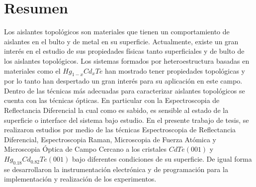 \chapter{Resumen}
\label{chap:abstract}

Los aislantes topológicos son materiales que tienen un comportamiento de aislantes en el bulto y de metal en su 
superficie. Actualmente, existe un gran interés en el estudio de sus propiedades físicas tanto superficiales y
de bulto de los aislantes topológicos. Los sistemas formados por heteroestructura basadas en materiales como el 
$ Hg_{1-x}Cd_{x}Te $ han mostrado tener propiedades topológicas y por lo tanto han despertado un gran interés para 
su aplicación en este campo. Dentro de las técnicas más adecuadas para caracterizar aislantes topológicos se cuenta 
con las técnicas ópticas. En particular con la Espectroscopia de Reflectancia Diferencial la cual como es sabido, 
es sensible al estado de la superficie o interface del sistema bajo estudio. En el presente trabajo de tesis, 
se realizaron estudios por medio de las técnicas Espectroscopia de Reflectancia Diferencial, Espectroscopia Raman, 
Microscopia de Fuerza Atómica y Microscopia Óptica de Campo Cercano a los cristales $ CdTe (001) $ y 
$ Hg_{0.18}Cd_{0.82}Te (001)$ bajo diferentes condiciones de su superficie. De igual forma se desarrollaron 
la instrumentación electrónica y de programación para la implementación y realización de los experimentos.